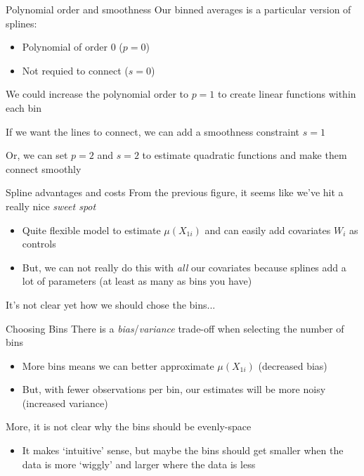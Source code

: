 \documentclass[aspectratio=169,t,11pt,table]{beamer}
\begin{document}


\begin{frame}{Polynomial order and smoothness}
  Our binned averages is a particular version of splines:
  \begin{itemize}
    \item Polynomial of order 0 ($p = 0$)
    \item Not requied to connect ($s = 0$)
  \end{itemize}

  \bigskip
  We could increase the polynomial order to $p = 1$ to create linear functions within each bin

  \bigskip
  If we want the lines to connect, we can add a smoothness constraint $s = 1$

  \bigskip
  Or, we can set $p = 2$ and $s = 2$ to estimate quadratic functions and make them connect smoothly
\end{frame}


\begin{frame}{Spline advantages and costs}
  From the previous figure, it seems like we've hit a really nice \emph{sweet spot}
  \begin{itemize}
    \item Quite flexible model to estimate $\mu(X_{1i})$ and can easily add covariates $W_i$ as controls
    
    \item But, we can not really do this with \emph{all} our covariates because splines add a lot of parameters (at least as many as bins you have)
  \end{itemize}

  \pause
  \bigskip
  It's not clear yet how we should chose the bins...
\end{frame}

% 


\begin{frame}{Choosing Bins}
  There is a \emph{bias}/\emph{variance} trade-off when selecting the number of bins
  \begin{itemize}
    \item More bins means we can better approximate $\mu(X_{1i})$ (decreased bias)
    
    \item But, with fewer observations per bin, our estimates will be more noisy (increased variance)
  \end{itemize}

  \bigskip
  More, it is not clear why the bins should be evenly-space
  \begin{itemize}
    \item It makes `intuitive' sense, but maybe the bins should get smaller when the data is more `wiggly' and larger where the data is less
  \end{itemize}
\end{frame}
\end{document}
